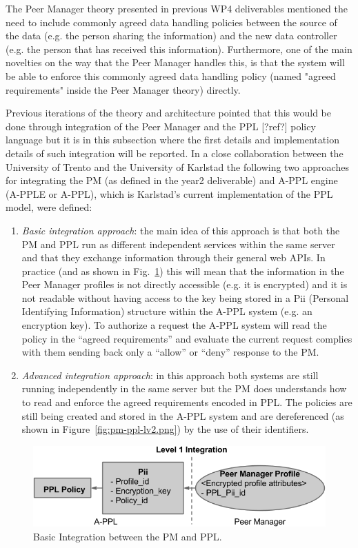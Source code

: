 The Peer Manager theory presented in previous WP4 deliverables mentioned the need to include commonly agreed data handling policies between the source of the data (e.g. the person sharing the information) and the new data controller (e.g. the person that has received this information). Furthermore, one of the main novelties on the way that the Peer Manager handles this, is that the system will be able to enforce this commonly agreed data handling policy (named "agreed requirements" inside the Peer Manager theory) directly.

Previous iterations of the theory and architecture pointed that this would be done through integration of the Peer Manager and the PPL [?ref?] policy language but it is in this subsection where the first details and implementation details of such integration will be reported. 
In a close collaboration between the University of Trento and the University of Karlstad the following two approaches for integrating the PM (as defined in the year2 deliverable) and A-PPL engine (A-PPLE or A-PPL), which is Karlstad's current implementation of the PPL model, were defined:

\begin{enumerate}
	\item \emph{Basic integration approach}: the main idea of this approach is that both the PM and PPL run as different independent services within the same server and that they exchange information through their general web APIs. In practice (and as shown in Fig.~\ref{fig:pm-ppl-lv1.png}) this will mean that the information in the Peer Manager profiles is not directly accessible (e.g. it is encrypted) and it is not readable without having access to the key being stored in a Pii (Personal Identifying Information) structure within the A-PPL system  (e.g. an encryption key). To authorize a request the A-PPL system will read the policy in the ``agreed requirements'' and evaluate the current request complies with them sending back only a ``allow'' or ``deny'' response to the PM. 
	\item \emph{Advanced integration approach}: in this approach both systems are still running independently in the same server but the PM does understands how to read and enforce the agreed requirements encoded in PPL. The policies are still being created and stored in the A-PPL system and are dereferenced (as shown in Figure~\ref{fig:pm-ppl-lv2.png}) by the use of their identifiers.
\end{enumerate}

\begin{figure}[htb!]
\centering
\includegraphics[width=0.8\linewidth]{figures/pm-ppl-lv1.png}
\caption{Basic Integration between the PM and PPL.}
\label{fig:pm-ppl-lv1.png}
\end{figure}

